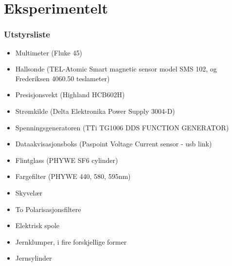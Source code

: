 \documentclass[%
 reprint,
 amsmath,amssymb,
 aps,
 norsk,
]{revtex4-1}
\begin{document}
\section{\label{sec:level3}Eksperimentelt}
\subsubsection{Utstyrsliste}
\begin{itemize}
  \item Multimeter (Fluke 45)
  \item Hallsonde (TEL-Atomic Smart magnetic sensor model SMS 102, og Frederiksen 4060.50 teslameter)
  \item Presisjonsvekt (Highland HCB602H)
  \item Strømkilde (Delta Elektronika Power Supply 3004-D)
  \item Spenningsgeneratoren (TTi TG1006 DDS FUNCTION GENERATOR)
  \item Dataakvisasjonsboks (Paspoint Voltage Current sensor - usb link)
  \item Flintglass (PHYWE SF6 cylinder)
  \item Fargefilter (PHYWE 440, 580, 595nm)
  \item Skyvelær
  \item To Polarisasjonsfiltere
  \item Elektrisk spole
  \item Jernklumper, i fire forskjellige former
  \item Jernsylinder
\end{itemize}
\end{document}
